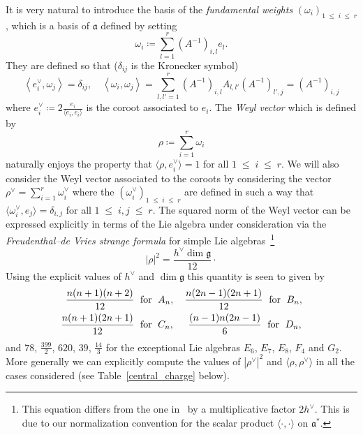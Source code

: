 \documentclass[AHL,Unicode,longabstracts,published]{cedram}
\renewcommand{\leq}{\;\leqslant\;}
\newcommand{\frkg}{\mathfrak{g}}
\newcommand{\frka}{\mathfrak{a}}
\newcommand{\ps}[1]{\langle #1 \rangle}
\newcommand{\norm}[1]{\left\lvert#1\right\rvert}
\begin{document}
It is very natural to introduce the basis of the \emph{fundamental weights} $(\omega_i)_{1\leq i \leq r}$, which is a basis of $\frka$ defined by setting
\begin{equation}
\omega_i\coloneqq \sum_{l=1}^{r} \left(A^{-1}\right)_{i,l}e_l.
\end{equation}
They are defined so that ($ \delta_{ij}$ is the Kronecker symbol)
\begin{equation}\label{relweights}
\left\langle e_i^{\vee},\omega_j\right\rangle= \delta_{ij},\quad \left\langle \omega_i,\omega_j \right\rangle= \sum_{l,l'=1}^{r} \left(A^{-1}\right)_{i,l} A_{l,l'} \left(A^{-1}\right)_{l',j}=\left(A^{-1}\right)_{i,j}
\end{equation}
where $e_i^{\vee}\coloneqq 2\frac{e_i}{\ps{e_i,e_i}}$ is the coroot associated to $e_i$. The \emph{Weyl vector} which is defined by
\begin{equation}
\rho\coloneqq \sum_{i=1}^r \omega_i
\end{equation}
naturally enjoys the property that $\ps{\rho,e_i^{\vee}}=1$ for all $1\leq i\leq r$. We will also consider the Weyl vector associated to the coroots by considering the vector $\rho^\vee=\sum_{i=1}^r\omega_i^\vee$ where the $(\omega_i^\vee)_{1\leq i\leq r}$ are defined in such a way that $\ps{\omega_i^{\vee},e_j}=\delta_{i,j}$ for all $1\leq i,j\leq r$. The squared norm of the Weyl vector can be expressed explicitly in terms of the Lie algebra under consideration via the \emph{Freudenthal--de Vries strange formula} for simple Lie algebras~\cite[Equation~(47.11)]{FdV}\footnote{This equation differs from the one in~\cite{FdV} by a multiplicative factor $2h^\vee$. This is due to our normalization convention for the scalar product $\ps{\cdot,\cdot}$ on $\frka^*$.}
\begin{equation}
\norm{\rho}^2=\frac{h^\vee\dim \frkg}{12}\cdot
\end{equation}
Using the explicit values of $h^\vee$ and $\dim \frkg$ this quantity is seen to given by
\begin{equation}\label{Weyl_norm}
\begin{split}
\frac{n(n+1)(n+2)}{12}\;&\text{ for }\;A_n,\quad\frac{n(2n-1)(2n+1)}{12}\;\text{ for }\;B_n,\\
\frac{n(n+1)(2n+1)}{12}\;&\text{ for }\;C_n,\mkern25mu\frac{(n-1)n(2n-1)}{6}\;\text{ for }\;D_n,
\end{split}
\end{equation}
and $78$, $\frac{399}{2}$, $620$, $39$, $\frac{14}{3}$ for the exceptional Lie algebras $E_6$, $E_7$, $E_8$, $F_4$ and $G_2$. More generally we can explicitly compute the values of $\norm{\rho^\vee}^2$ and $\ps{\rho,\rho^\vee}$ in all the cases considered (see Table~\eqref{central_charge} below).
\end{document}
